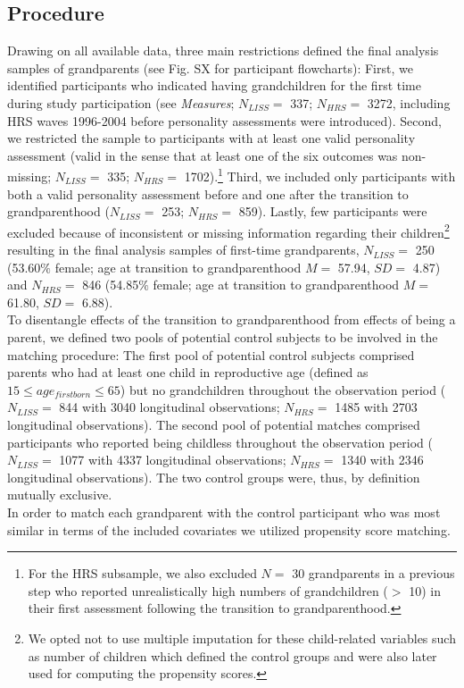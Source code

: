 \documentclass[
  english,
  man, noextraspace]{apa7}
\begin{document}
\hypertarget{procedure}{%
\subsection{Procedure}\label{procedure}}

Drawing on all available data, three main restrictions defined the final analysis samples of grandparents (see Fig. SX for participant flowcharts): First, we identified participants who indicated having grandchildren for the first time during study participation (see \emph{Measures}; \(N_{LISS} =\) 337; \(N_{HRS} =\) 3272, including HRS waves 1996-2004 before personality assessments were introduced). Second, we restricted the sample to participants with at least one valid personality assessment (valid in the sense that at least one of the six outcomes was non-missing; \(N_{LISS} =\) 335; \(N_{HRS} =\) 1702).\footnote{For the HRS subsample, we also excluded \(N =\) 30 grandparents in a previous step who reported unrealistically high numbers of grandchildren (\(>\) 10) in their first assessment following the transition to grandparenthood.} Third, we included only participants with both a valid personality assessment before and one after the transition to grandparenthood (\(N_{LISS} =\) 253; \(N_{HRS} =\) 859). Lastly, few participants were excluded because of inconsistent or missing information regarding their children\footnote{We opted not to use multiple imputation for these child-related variables such as number of children which defined the control groups and were also later used for computing the propensity scores.} resulting in the final analysis samples of first-time grandparents, \(N_{LISS} =\) 250 (53.60\(\%\) female; age at transition to grandparenthood \(M =\) 57.94, \(SD =\) 4.87) and \(N_{HRS} =\) 846 (54.85\(\%\) female; age at transition to grandparenthood \(M =\) 61.80, \(SD =\) 6.88).\\
To disentangle effects of the transition to grandparenthood from effects of being a parent, we defined two pools of potential control subjects to be involved in the matching procedure: The first pool of potential control subjects comprised parents who had at least one child in reproductive age (defined as \(15 \leq age_{firstborn}\leq65\)) but no grandchildren throughout the observation period (\(N_{LISS} =\) 844 with 3040 longitudinal observations; \(N_{HRS} =\) 1485 with 2703 longitudinal observations). The second pool of potential matches comprised participants who reported being childless throughout the observation period (\(N_{LISS} =\) 1077 with 4337 longitudinal observations; \(N_{HRS} =\) 1340 with 2346 longitudinal observations). The two control groups were, thus, by definition mutually exclusive.\\
In order to match each grandparent with the control participant who was most similar in terms of the included covariates we utilized propensity score matching.
\end{document}
